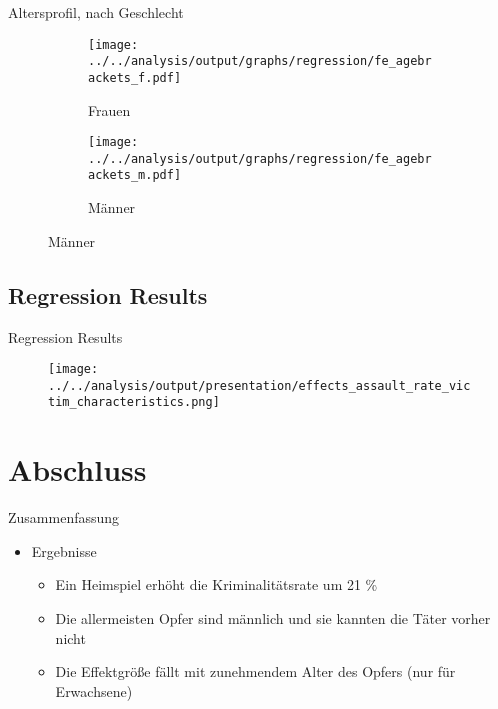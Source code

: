\documentclass[usenames,dvipsnames,ngerman]{beamer} %
\begin{document}
\begin{frame}{Altersprofil, nach Geschlecht}\label{link_regression_age_profile_per_gender}
\begin{figure}
	\begin{subfigure}[h]{0.48\linewidth}\centering\caption{Frauen}
		\texttt{[image: ../../analysis/output/graphs/regression/fe\_agebrackets\_f.pdf]}
	\end{subfigure}
	\begin{subfigure}[h]{0.48\linewidth}\centering\caption{Männer}
		\texttt{[image: ../../analysis/output/graphs/regression/fe\_agebrackets\_m.pdf]}
	\end{subfigure}
\end{figure}
\hyperlink{link_regression_age_profile}{}
\end{frame}

\subsection{Regression Results}
\begin{frame}{Regression Results}\label{link_regression_victim_characteristic}
\begin{figure}
	\texttt{[image: ../../analysis/output/presentation/effects\_assault\_rate\_victim\_characteristics.png]}
\end{figure}
\hyperlink{link_regression_baseline}{} \hyperlink{link_regression_lead_lags}{} \hyperlink{link_regression_crime_characteristics}{}
\end{frame}

\section{Abschluss}

\begin{frame}{Zusammenfassung}
	\begin{itemize}
		\item Ergebnisse
		\begin{itemize}
			\item Ein Heimspiel erhöht die Kriminalitätsrate um 21 \% 
			\item Die allermeisten Opfer sind männlich und sie kannten die Täter vorher nicht 
			\item  Die Effektgröße fällt mit zunehmendem Alter des Opfers (nur für Erwachsene)
		\end{itemize}				
	\end{itemize}
\end{frame}
\end{document}
